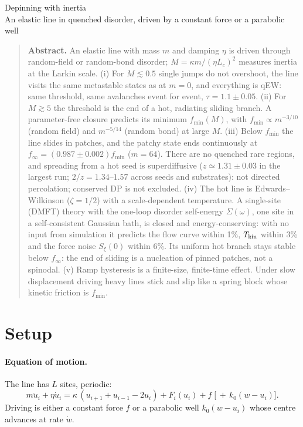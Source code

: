 \documentclass[10pt,a4paper]{article}
\begin{document}
\begin{center}
{\Large Depinning with inertia}\\[3pt]
{\small An elastic line in quenched disorder, driven by a constant force or a parabolic well}
\end{center}

\begin{quote}\small
\textbf{Abstract.}
An elastic line with mass $m$ and damping $\eta$ is driven through random-field or random-bond disorder; $M=\kappa m/(\eta L_c)^2$ measures inertia at the Larkin scale.
(i) For $M\lesssim0.5$ single jumps do not overshoot, the line visits the same metastable states as at $m=0$, and everything is qEW: same threshold, same avalanches event for event, $\tau=1.1\pm0.05$.
(ii) For $M\gtrsim5$ the threshold is the end of a hot, radiating sliding branch. A parameter-free closure predicts its minimum $f_{\min}(M)$, with $f_{\min}\propto m^{-3/10}$ (random field) and $m^{-5/14}$ (random bond) at large $M$.
(iii) Below $f_{\min}$ the line slides in patches, and the patchy state ends continuously at $f_\infty=(0.987\pm0.002)f_{\min}$ ($m=64$). There are no quenched rare regions, and spreading from a hot seed is superdiffusive ($z\simeq1.31\pm0.03$ in the largest run; $2/z=1.34$--$1.57$ across seeds and substrates): not directed percolation; conserved DP is not excluded.
(iv) The hot line is Edwards--Wilkinson ($\zeta=1/2$) with a scale-dependent temperature. A single-site (DMFT) theory with the one-loop disorder self-energy $\Sigma(\omega)$, one site in a self-consistent Gaussian bath, is closed and energy-conserving: with no input from simulation it predicts the flow curve within 1\%, $T_{\rm kin}$ within 3\% and the force noise $S_\xi(0)$ within 6\%. Its uniform hot branch stays stable below $f_\infty$: the end of sliding is a nucleation of pinned patches, not a spinodal.
(v) Ramp hysteresis is a finite-size, finite-time effect. Under slow displacement driving heavy lines stick and slip like a spring block whose kinetic friction is $f_{\min}$.
\end{quote}

\tableofcontents

\section{Setup}
\label{sec:model}

\paragraph{Equation of motion.} The line has $L$ sites, periodic:
\begin{equation}
m\ddot u_i+\eta\dot u_i=\kappa\,(u_{i+1}+u_{i-1}-2u_i)+F_i(u_i)+f\;\big[\,+\,k_0(w-u_i)\big].
\label{eq:eom}
\end{equation}
Driving is either a constant force $f$ or a parabolic well $k_0(w-u_i)$ whose centre advances at rate $\dot w$.
\end{document}
